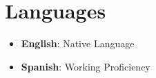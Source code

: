 \documentclass[letterpaper,11pt]{article}
\newcommand{\resumeItem}[2]{
  \item\small{
    \textbf{#1}{: #2 \vspace{-2pt}}
  }
}
\newcommand{\resumeSubItem}[2]{\resumeItem{#1}{#2}\vspace{-4pt}}
\newcommand{\resumeSubHeadingListStart}{\begin{itemize}[leftmargin=*]}
\newcommand{\resumeSubHeadingListEnd}{\end{itemize}}
\begin{document}
\section{Languages}
  \resumeSubHeadingListStart
    \resumeSubItem{English}
      {Native Language}
    \resumeSubItem{Spanish}
      {Working Proficiency}
  \resumeSubHeadingListEnd

%


\end{document}
